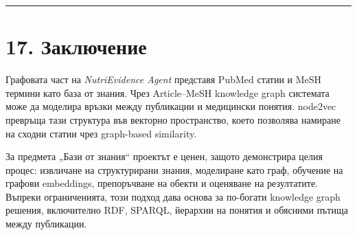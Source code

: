 \documentclass[12pt,a4paper]{article}
\begin{document}
\vspace{0.5em}\hrule\vspace{1.0em}

\section{17. Заключение}

Графовата част на \textit{NutriEvidence Agent} представя PubMed статии и MeSH термини като база от знания. Чрез Article--MeSH knowledge graph системата може да моделира връзки между публикации и медицински понятия. node2vec превръща тази структура във векторно пространство, което позволява намиране на сходни статии чрез graph-based similarity.

За предмета „Бази от знания“ проектът е ценен, защото демонстрира целия процес: извличане на структурирани знания, моделиране като граф, обучение на графови embeddings, препоръчване на обекти и оценяване на резултатите. Въпреки ограниченията, този подход дава основа за по-богати knowledge graph решения, включително RDF, SPARQL, йерархии на понятия и обясними пътища между публикации.
\end{document}
